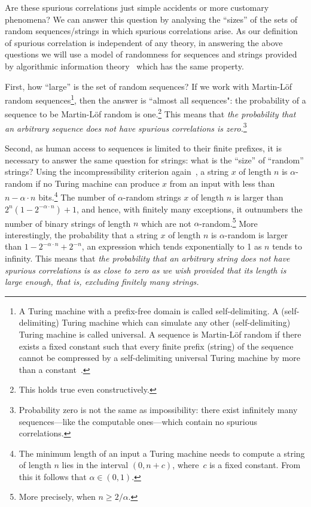 \documentclass[12pt]{article}
\begin{document}
Are these spurious correlations just simple accidents or  more customary phenomena?  We can  answer this question by analysing the ``sizes'' of the sets of random sequences/strings in which   spurious correlations arise.  As our definition of spurious correlation is  independent of any theory, in answering the above questions we will use a model of randomness for sequences and strings provided by algorithmic information theory~\cite{calude:02,DH} which has the same property.

First, how ``large'' is the set of random sequences? If we work with Martin-L\"of random sequences\footnote{A Turing machine with a prefix-free domain is called self-delimiting. A (self-delimiting) Turing machine which can simulate any other  (self-delimiting) Turing machine
is called universal. A sequence  is Martin-L\"of random if there exists a fixed constant such that every finite prefix (string) of the sequence cannot be compressed by a self-delimiting universal Turing machine by more than a constant~\cite{calude:02}.}, then the answer is ``almost all sequences": the probability of a sequence to be Martin-L\"of random is one.\footnote{This holds true even constructively.} This means that {\it the probability that an arbitrary sequence does not have spurious correlations is zero.}\footnote{Probability zero is not the same as impossibility: there exist infinitely many sequences---like the computable ones---which contain no spurious correlations.}

Second, as human access to sequences is limited to their finite  prefixes,   it is necessary to answer the same question for strings: what is the ``size''
of  ``random'' strings? Using
the incompressibility criterion again~\cite{suprious2016},
a string $x$  of length $n$ is  $\alpha$-random
if no Turing machine  can produce  $x$   from an input with less than  $n- \alpha \cdot n$ bits.\footnote{The minimum length  of an input a Turing machine needs to compute a string of length $n$ lies in the interval $(0, n+c)$, where~$c$ is a fixed constant. From this  it follows that $\alpha \in (0,1)$.}
The number of $\alpha$-random   strings $x$ of length $n$  is larger than
$2^{n}\left(1 - 2^{-\alpha \cdot n }\right) +1$,
and
hence, with finitely many exceptions,  it outnumbers  the number of binary strings of length $n$ which are not $\alpha$-random.\footnote{More precisely, when $n\geq 2/\alpha$.}
More interestingly, the probability that a string $x$ of length $n$ is $\alpha$-random
is larger than
$1- 2^{- \alpha \cdot n }+ 2^{-n}$,
an expression which tends exponentially to 1 as $n$ tends to infinity. This means that {\it the probability that an arbitrary string does not have spurious correlations is as close to zero as we wish provided that its length is large enough, that is, excluding finitely many strings.}
\end{document}
